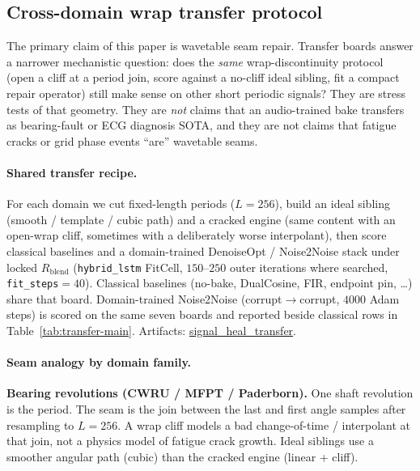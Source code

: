 
\subsection{Cross-domain wrap transfer protocol}
\label{sec:transfer-protocol}

The primary claim of this paper is wavetable seam repair.
Transfer boards answer a narrower mechanistic question:
does the \emph{same} wrap-discontinuity protocol (open a cliff at a period join, score against a no-cliff ideal sibling, fit a compact repair operator) still make sense on other short periodic signals?
They are stress tests of that geometry.
They are \emph{not} claims that an audio-trained bake transfers as bearing-fault or ECG diagnosis SOTA,
and they are not claims that fatigue cracks or grid phase events ``are'' wavetable seams.

\paragraph{Shared transfer recipe.}
For each domain we cut fixed-length periods ($L{=}256$), build an ideal sibling (smooth / template / cubic path)
and a cracked engine (same content with an open-wrap cliff, sometimes with a deliberately worse interpolant),
then score classical baselines and a domain-trained DenoiseOpt / Noise2Noise stack under locked $R_{\mathrm{blend}}$
(\texttt{hybrid\_lstm} FitCell, $150$--$250$ outer iterations where searched, \texttt{fit\_steps}${}={}40$).
Classical baselines (no-bake, DualCosine, FIR, endpoint pin, \ldots) share that board.
Domain-trained Noise2Noise (corrupt$\to$corrupt, $4000$ Adam steps) is scored on the same seven boards
and reported beside classical rows in Table~\ref{tab:transfer-main}.
Artifacts:
\href{https://github.com/reeldemo/reelsynth/tree/main/brand/artifacts/signal_heal_transfer}{signal\_heal\_transfer}.

\paragraph{Seam analogy by domain family.}
\textbf{Bearing revolutions (CWRU / MFPT / Paderborn).}
One shaft revolution is the period.
The seam is the join between the last and first angle samples after resampling to $L{=}256$.
A wrap cliff models a bad change-of-time / interpolant at that join, not a physics model of fatigue crack growth.
Ideal siblings use a smoother angular path (cubic) than the cracked engine (linear + cliff).

